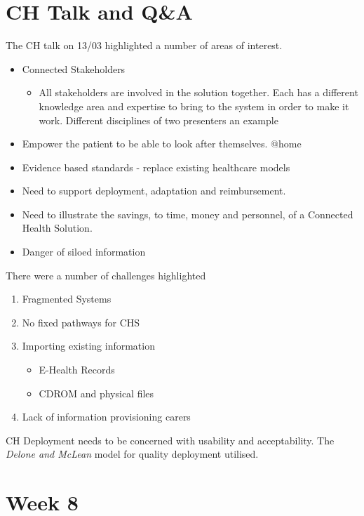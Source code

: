 \chapter{CH Talk and Q\&A}

The CH talk on 13/03 highlighted a number of areas of interest.

\begin{itemize}
\item Connected Stakeholders
\begin{itemize}
\item All stakeholders are involved in the solution together. Each has a different knowledge area and expertise to bring to the system in order to make it work. Different disciplines of two presenters an example
\end{itemize}
\item Empower the patient to be able to look after themselves. @home
\item Evidence based standards - replace existing healthcare models
\item Need to support deployment, adaptation and reimbursement.
\item Need to illustrate the savings, to time, money and personnel, of a Connected Health Solution.
\item Danger of siloed information
\end{itemize}

There were a number of challenges highlighted

\begin{enumerate}
\item Fragmented Systems
\item No fixed pathways for CHS
\item Importing existing information
\begin{itemize}
\item E-Health Records
\item CDROM and physical files
\end{itemize}
\item Lack of information provisioning carers
\end{enumerate}

CH Deployment needs to be concerned with usability and acceptability. The \textit{Delone and McLean} model for quality deployment utilised.
\chapter{Week 8}

